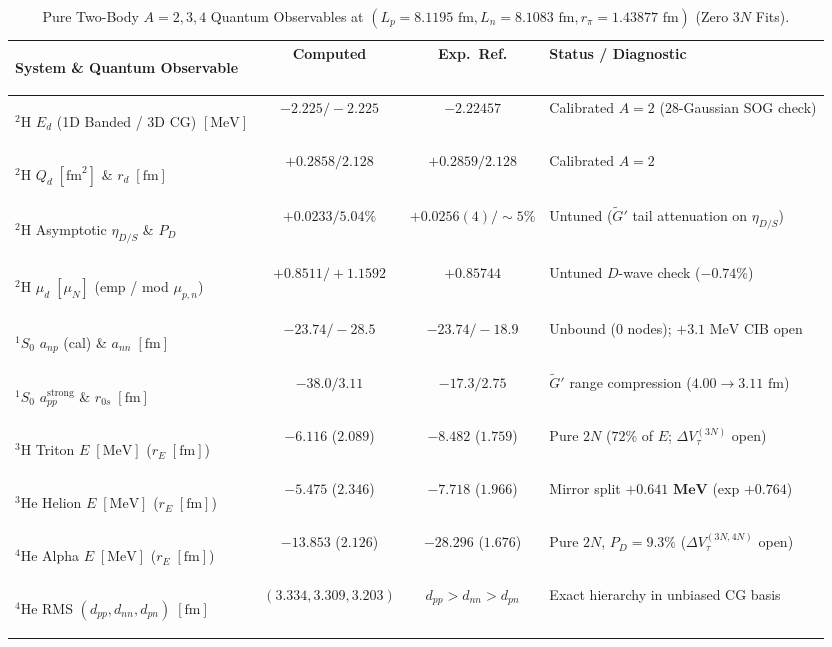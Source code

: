 \documentclass[11pt, a4paper]{article}
\begin{document}
\begin{table}[!htbp]
\centering
\caption{Pure Two-Body $A = 2, 3, 4$ Quantum Observables at $(L_p = 8.1195\text{ fm}, L_n = 8.1083\text{ fm}, r_\pi = 1.43877\text{ fm})$ (Zero $3N$ Fits).}
\label{tab:a234_quantum}
\footnotesize
\setlength{\tabcolsep}{4.5pt}
\renewcommand{\arraystretch}{1.18}
\begin{tabularx}{\textwidth}{>{\bfseries\raggedright\arraybackslash}p{} c c >{\raggedright\arraybackslash}X}
\toprule
System \& Quantum Observable & Computed & Exp.\ Ref. & Status / Diagnostic \\
\midrule
$^2\text{H}$ $E_d$ (1D Banded / 3D CG) $[\text{MeV}]$ & $\mathbf{-2.225 / -2.225}$ & $-2.22457$ & Calibrated $A = 2$ ($28$-Gaussian SOG check) \\
$^2\text{H}$ $Q_d\;[\text{fm}^2]$ \& $r_d\;[\text{fm}]$ & $+0.2858 / 2.128$ & $+0.2859 / 2.128$ & Calibrated $A = 2$ \\
$^2\text{H}$ Asymptotic $\eta_{D/S}$ \& $P_D$ & $+0.0233 / \mathbf{5.04\%}$ & $+0.0256(4) / {\sim}5\%$ & Untuned ($\widetilde{G}'$ tail attenuation on $\eta_{D/S}$) \\
$^2\text{H}$ $\mu_d\;[\mu_N]$ (emp / mod $\mu_{p,n}$) & $\mathbf{+0.8511} / +1.1592$ & $+0.85744$ & Untuned $D$-wave check ($-0.74\%$) \\
$^1S_0$ $a_{np}$ (cal) \& $a_{nn}\;[\text{fm}]$ & $-23.74 / -28.5$ & $-23.74 / -18.9$ & Unbound ($0$ nodes); $+3.1\text{ MeV}$ CIB open \\
$^1S_0$ $a_{pp}^{\mathrm{strong}}$ \& $r_{0s}\;[\text{fm}]$ & $-38.0 / \mathbf{3.11}$ & $-17.3 / 2.75$ & $\widetilde{G}'$ range compression ($4.00\to 3.11\text{ fm}$) \\
$^3\text{H}$ Triton $E\;[\text{MeV}]$ ($r_E\;[\text{fm}]$) & $\mathbf{-6.116}$ ($2.089$) & $-8.482$ ($1.759$) & Pure $2N$ ($72\%$ of $E$; $\Delta V_\tau^{(3N)}$ open) \\
$^3\text{He}$ Helion $E\;[\text{MeV}]$ ($r_E\;[\text{fm}]$) & $\mathbf{-5.475}$ ($2.346$) & $-7.718$ ($1.966$) & Mirror split $\mathbf{+0.641\text{ MeV}}$ (exp $+0.764$) \\
$^4\text{He}$ Alpha $E\;[\text{MeV}]$ ($r_E\;[\text{fm}]$) & $-13.853$ ($2.126$) & $-28.296$ ($1.676$) & Pure $2N$, $P_D = 9.3\%$ ($\Delta V_\tau^{(3N,4N)}$ open) \\
$^4\text{He}$ RMS $(d_{pp}, d_{nn}, d_{pn})\;[\text{fm}]$ & $\mathbf{(3.334, 3.309, 3.203)}$ & $d_{pp} > d_{nn} > d_{pn}$ & Exact hierarchy in unbiased CG basis \\
\bottomrule
\end{tabularx}
\end{table}
\end{document}

